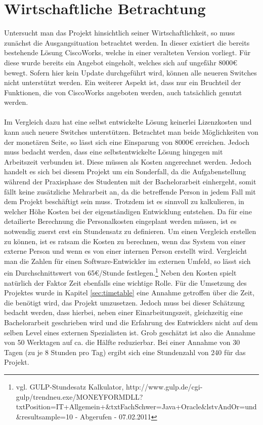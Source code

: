 \section{Wirtschaftliche Betrachtung}
\label{sec:economicloverview}

Untersucht man das Projekt hinsichtlich seiner Wirtschaftlichkeit, so muss zunächst die Ausgangsituation betrachtet werden. In dieser existiert die bereits bestehende Lösung CiscoWorks, welche in einer veralteten Version vorliegt. Für diese wurde bereits ein Angebot eingeholt, welches sich auf ungefähr 8000€ bewegt. Sofern hier kein Update durchgeführt wird, können alle neueren Switches nicht unterstützt werden.
Ein weiterer Aspekt ist, dass nur ein Bruchteil der Funktionen, die von CiscoWorks angeboten werden, auch tatsächlich genutzt werden.\\\\
Im Vergleich dazu hat eine selbst entwickelte Lösung keinerlei Lizenzkosten und kann auch neuere Switches unterstützen. Betrachtet man beide Möglichkeiten von der monetären Seite, so lässt sich eine Einsparung von 8000€ erreichen. Jedoch muss bedacht werden, dass eine selbstentwickelte Lösung hingegen mit Arbeitszeit  verbunden ist.  Diese müssen als Kosten angerechnet werden. Jedoch handelt es sich bei diesem Projekt um ein Sonderfall, da die Aufgabenstellung während der Praxisphase des Studenten mit der Bachelorarbeit einhergeht, somit fällt keine zusätzliche Mehrarbeit an, da die betreffende Person in jedem Fall mit dem Projekt beschäftigt sein muss.
Trotzdem ist es sinnvoll zu kalkulieren, in welcher Höhe Kosten bei der eigenständigen Entwicklung entstehen.
Da für eine detailierte Berechnung die Personalkosten eingeplant werden müssen, ist es notwendig zuerst erst ein Stundensatz zu definieren.
Um einen Vergleich erstellen zu können, ist es ratsam die Kosten zu berechnen, wenn das System von einer externe Person und wenn es von einer internen Person erstellt wird.
Vergleicht man die Zahlen für einen Software-Entwickler im externen Umfeld, so lässt sich ein Durchschnittswert von 65€/Stunde festlegen.\footnote{vgl. GULP-Stundesatz Kalkulator, http://www.gulp.de/cgi-gulp/trendneu.exe/MONEYFORMDLL?txtPosition=IT+Allgemein+\&txtFachSchwer=Java+Oracle\&lstvAndOr=und\&resultsample=10 - Abgerufen - 07.02.2011}
Neben den Kosten spielt natürlich der Faktor Zeit ebenfalls eine wichtige Rolle. Für die Umsetzung des Projektes wurde in Kapitel \ref{sec:timetable} eine Annahme getroffen über die Zeit, die benötigt wird, das Projekt umzusetzen. Jedoch muss bei dieser Schätzung bedacht werden, dass hierbei, neben einer Einarbeitungszeit, gleichzeitig eine Bachelorarbeit geschrieben wird und die Erfahrung des Entwicklers nicht auf dem selben Level eines externen Spezialisten ist. Grob geschätzt ist also die Annahme von 50 Werktagen auf ca. die Hälfte reduzierbar. Bei einer Annahme von 30 Tagen (zu je 8 Stunden pro Tag) ergibt sich eine Stundenzahl von 240 für das Projekt.
